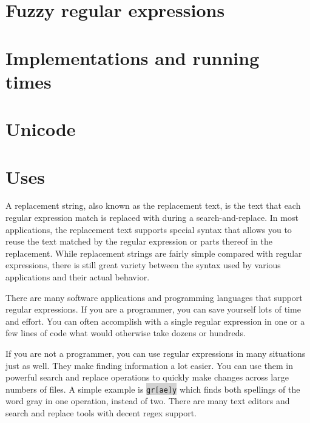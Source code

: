 \chapter{Fuzzy regular expressions}







\chapter{Implementations and running times}





\chapter{Unicode}







\chapter{Uses}

A replacement string, also known as the replacement text, is the text that each regular expression match is replaced with during a search-and-replace. In most applications, the replacement text supports special syntax that allows you to reuse the text matched by the regular expression or parts thereof in the replacement. While replacement strings are fairly simple compared with regular expressions, there is still great variety between the syntax used by various applications and their actual behavior.

There are many software applications and programming languages that support regular expressions. If you are a programmer, you can save yourself lots of time and effort. You can often accomplish with a single regular expression in one or a few lines of code what would otherwise take dozens or hundreds.

If you are not a programmer, you can use regular expressions in many situations just as well. They make finding information a lot easier. You can use them in powerful search and replace operations to quickly make changes across large numbers of files. A simple example is \colorbox{lightgray}{\texttt{gr[ae]y}} which finds both spellings of the word gray in one operation, instead of two. There are many text editors and search and replace tools with decent regex support.







